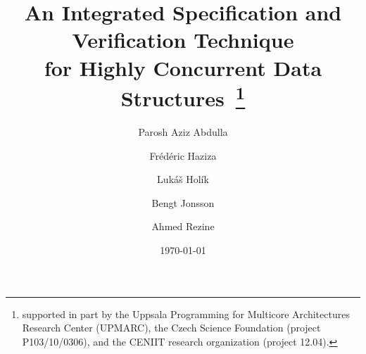 
\title{An Integrated Specification and Verification Technique\\for Highly Concurrent
Data Structures~\thanks{
supported in part by the Uppsala Programming for Multicore
Architectures Research Center (UPMARC),
the Czech Science Foundation (project P103/10/0306), 
and the CENIIT research organization (project 12.04).
}}

\author{
  Parosh Aziz Abdulla  \and
  Fr\'ed\'eric Haziza  \and
  Luk\'a\v s Hol\'ik    \and
  Bengt Jonsson        \and
  Ahmed Rezine } 


\date{\today}

\maketitle

